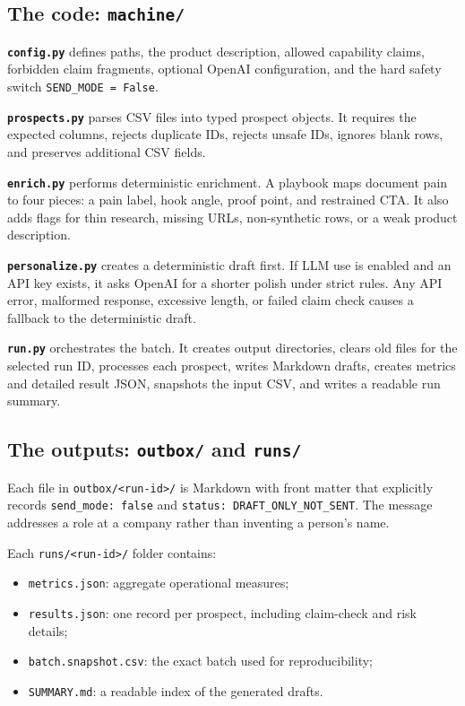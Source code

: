 \documentclass[11pt,a4paper]{article}
\newcommand{\pathcode}[1]{\texttt{#1}}
\begin{document}
\subsection{The code: \pathcode{machine/}}

\textbf{\pathcode{config.py}} defines paths, the product description, allowed capability claims, forbidden claim fragments, optional OpenAI configuration, and the hard safety switch \pathcode{SEND\_MODE = False}.

\textbf{\pathcode{prospects.py}} parses CSV files into typed prospect objects. It requires the expected columns, rejects duplicate IDs, rejects unsafe IDs, ignores blank rows, and preserves additional CSV fields.

\textbf{\pathcode{enrich.py}} performs deterministic enrichment. A playbook maps document pain to four pieces: a pain label, hook angle, proof point, and restrained CTA. It also adds flags for thin research, missing URLs, non-synthetic rows, or a weak product description.

\textbf{\pathcode{personalize.py}} creates a deterministic draft first. If LLM use is enabled and an API key exists, it asks OpenAI for a shorter polish under strict rules. Any API error, malformed response, excessive length, or failed claim check causes a fallback to the deterministic draft.

\textbf{\pathcode{run.py}} orchestrates the batch. It creates output directories, clears old files for the selected run ID, processes each prospect, writes Markdown drafts, creates metrics and detailed result JSON, snapshots the input CSV, and writes a readable run summary.

\subsection{The outputs: \pathcode{outbox/} and \pathcode{runs/}}

Each file in \pathcode{outbox/<run-id>/} is Markdown with front matter that explicitly records \pathcode{send\_mode: false} and \pathcode{status: DRAFT\_ONLY\_NOT\_SENT}. The message addresses a role at a company rather than inventing a person's name.

Each \pathcode{runs/<run-id>/} folder contains:

\begin{itemize}
  \item \pathcode{metrics.json}: aggregate operational measures;
  \item \pathcode{results.json}: one record per prospect, including claim-check and risk details;
  \item \pathcode{batch.snapshot.csv}: the exact batch used for reproducibility;
  \item \pathcode{SUMMARY.md}: a readable index of the generated drafts.
\end{itemize}
\end{document}
